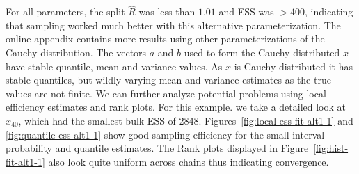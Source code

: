 \documentclass[american,]{article}
\theoremstyle{definition}
\begin{document}

For all parameters, the split-\(\widehat{R}\) was less than \(1.01\) and 
ESS was \(>400\), indicating that
sampling worked much better with this alternative parameterization.
The online appendix contains more results using other parameterizations 
of the Cauchy distribution. The vectors \(a\) and \(b\) used
to form the Cauchy distributed \(x\) have stable quantile, mean and
variance values. As \(x\) is Cauchy distributed it has stable
quantiles, but wildly varying mean and variance estimates as the true values
are not finite.
%
We can further analyze potential problems using local efficiency
estimates and rank plots. For this example. we take a detailed look at 
\(x_{40}\), which had the smallest bulk-ESS of 2848.
%
Figures~\ref{fig:local-ess-fit-alt1-1} and
\ref{fig:quantile-ess-alt1-1} show good sampling efficiency for the
small interval probability and quantile estimates.
%
The Rank plots displayed in Figure~\ref{fig:hist-fit-alt1-1} also look quite 
uniform across chains thus indicating convergence.
\end{document}
